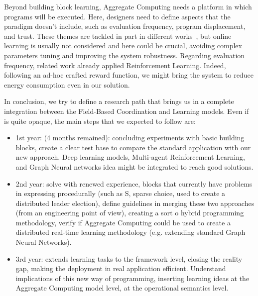 \documentclass[conference]{IEEEtran}
\begin{document}
Beyond building block learning, Aggregate Computing needs a platform in which programs will be executed. 
Here, designers need to define aspects that the paradigm doesn't include, 
such as evaluation frequency, program displacement, and trust. 
These themes are tackled in part in different works~\cite{DBLP:journals/scp/CasadeiAV18, DBLP:journals/fi/CasadeiPPVW20, DBLP:journals/corr/abs-2012-13806}, 
but online learning is usually not considered and here could be crucial, 
avoiding complex parameters tuning and improving the system robustness.
Regarding evaluation frequency, related work already applied Reinforcement Learning. 
Indeed, following an ad-hoc crafted reward function, we might bring the system to reduce energy consumption even in our solution.

In conclusion, we try to define a research path that brings us in a complete integration between the Field-Based Coordination and Learning models. Even if is quite opaque, the main
steps that we expected to follow are:
\begin{itemize}
    \item 1st year: (4 months remained): concluding experiments with basic building blocks, create a clear test base to compare the standard application with our new approach. Deep learning models, Multi-agent Reinforcement Learning, and Graph Neural networks idea might be integrated to reach good solutions.
    \item 2nd year: solve with renewed experience, blocks that currently have problems in expressing procedurally (such as S, sparse choice, used to create a distributed leader election),
    define guidelines in merging these two approaches (from an engineering point of view), creating a sort o hybrid programming methodology, verify if Aggregate Computing could be used to create a distributed real-time learning methodology (e.g. extending standard Graph Neural Networks).
    \item 3rd year: extends learning tasks to the framework level, closing the reality gap, making the deployment in real application efficient. Understand implications of this new way of programming, inserting learning ideas at the Aggregate Computing model level, at the operational semantics level. 
\end{itemize}



\end{document}
